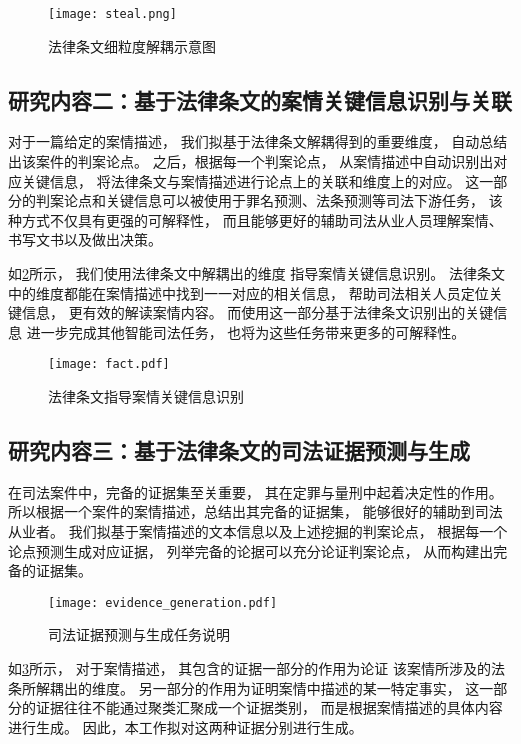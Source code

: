 \begin{figure}[h]
	\centering
	\texttt{[image: steal.png]}
	\caption{法律条文细粒度解耦示意图}
	\label{law_analyse}
\end{figure}

\subsection{研究内容二：基于法律条文的案情关键信息识别与关联}
对于一篇给定的案情描述，
我们拟基于法律条文解耦得到的重要维度，
自动总结出该案件的判案论点。
之后，根据每一个判案论点，
从案情描述中自动识别出对应关键信息，
将法律条文与案情描述进行论点上的关联和维度上的对应。
这一部分的判案论点和关键信息可以被使用于罪名预测、法条预测等司法下游任务，
该种方式不仅具有更强的可解释性，
而且能够更好的辅助司法从业人员理解案情、书写文书以及做出决策。

如\cref{fact}所示，
我们使用法律条文中解耦出的维度
指导案情关键信息识别。
法律条文中的维度都能在案情描述中找到一一对应的相关信息，
帮助司法相关人员定位关键信息，
更有效的解读案情内容。
而使用这一部分基于法律条文识别出的关键信息
进一步完成其他智能司法任务，
也将为这些任务带来更多的可解释性。

\begin{figure}[h]
	\centering
	\texttt{[image: fact.pdf]}
	\caption{法律条文指导案情关键信息识别}
	\label{fact}
\end{figure}

\subsection{研究内容三：基于法律条文的司法证据预测与生成}
在司法案件中，完备的证据集至关重要，
其在定罪与量刑中起着决定性的作用。
所以根据一个案件的案情描述，总结出其完备的证据集，
能够很好的辅助到司法从业者。
我们拟基于案情描述的文本信息以及上述挖掘的判案论点，
根据每一个论点预测生成对应证据，
列举完备的论据可以充分论证判案论点，
从而构建出完备的证据集。

\begin{figure}[h]
	\centering
	\texttt{[image: evidence\_generation.pdf]}
	\caption{司法证据预测与生成任务说明}
	\label{evidence}
\end{figure}

如\cref{evidence}所示，
对于案情描述，
其包含的证据一部分的作用为论证
该案情所涉及的法条所解耦出的维度。
另一部分的作用为证明案情中描述的某一特定事实，
这一部分的证据往往不能通过聚类汇聚成一个证据类别，
而是根据案情描述的具体内容进行生成。
因此，本工作拟对这两种证据分别进行生成。


